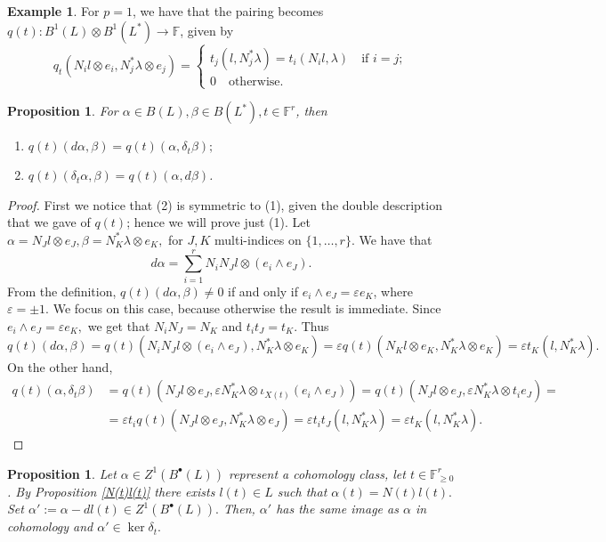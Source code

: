 \documentclass[a4paper,12 pt,titlepage,twoside]{book}
\newcommand{\numberset}{\mathbb}
\newcommand{\F}{\numberset{F}}
\newcommand{\epsi}{\varepsilon}
\theoremstyle{plain}
\theoremstyle{theorem}
\newtheorem{prop}[thm]{Proposition}
\theoremstyle{definition}
\newtheorem{exm}[thm]{Example}
\theoremstyle{remark}
\begin{document}
	\begin{exm}
		For $p=1$, we have that the pairing becomes $q(t) \colon B^1(L) \otimes B^1(L^*) \rightarrow \F$, given by $$q_t(N_i l \otimes e_i, N_j^* \lambda \otimes e_j) = \begin{cases}
		t_j(l, N_j^*\lambda) = t_i(N_il, \lambda) \quad \text{if } i=j;\\ 0 \quad \text{otherwise}.
		\end{cases}$$
	\end{exm}
	\begin{prop}\label{pseudosymmetry}
		For $\alpha \in B(L), \beta \in B(L^*), t \in \F^r$, then \begin{enumerate}[label=(\arabic*)]
			\item $q(t)(d\alpha, \beta) = q(t)(\alpha, \delta_t \beta);$
			\item $q(t)(\delta_t\alpha, \beta) = q(t)(\alpha, d\beta)$.
		\end{enumerate}
	\end{prop}
	\begin{proof}
		First we notice that (2) is symmetric to (1), given the double description that we gave of $q(t)$; hence we will prove just (1). Let $\alpha = N_J l \otimes e_J, \beta = N_K^* \lambda \otimes e_K,$ for $J,K$ multi-indices on $\{1, \dots, r\}.$ We have that $$d\alpha = \sum_{i=1}^r N_i N_J l \otimes (e_i \wedge e_J).$$ From the definition, $q(t)(d\alpha, \beta) \neq 0$ if and only if $e_i \wedge e_J = \epsi e_K$, where $\epsi =\pm 1.$ We focus on this case, because otherwise the result is immediate. Since $e_i \wedge e_J = \epsi e_K,$ we get that $N_i N_J = N_K$ and $t_i t_J = t_K.$ Thus $$q(t)(d\alpha, \beta) = q(t)(N_i N_J l \otimes (e_i\wedge e_J), N_K^*\lambda \otimes e_K) = \epsi q(t)(N_Kl \otimes e_K, N_K^* \lambda \otimes e_K) = \epsi t_K(l, N_K^* \lambda).$$ On the other hand, $$\begin{aligned} q(t)(\alpha, \delta_t \beta) &= q(t)(N_J l \otimes e_J, \epsi N_K^* \lambda \otimes \iota_{X(t)}(e_i \wedge e_J)) = q(t)(N_J l \otimes e_J, \epsi N_K^* \lambda \otimes t_i e_J) =\\&= \epsi t_i q(t)(N_J l \otimes e_J, N_K^*\lambda \otimes e_J) = \epsi t_i t_J (l, N_K^* \lambda) = \epsi t_K (l, N_K^* \lambda). \end{aligned}$$
	\end{proof}
	\begin{prop}\label{alpha'}
		Let $\alpha \in Z^1(B^\bullet(L))$ represent a cohomology class, let $t \in \F^r_{\ge 0}$. By Proposition \ref{N(t)l(t)} there exists $l(t) \in L$ such that $\alpha(t) = N(t)l(t).$ Set $\alpha' := \alpha - dl(t) \in Z^1(B^\bullet(L)).$ Then, $\alpha'$ has the same image as $\alpha$ in cohomology and $\alpha' \in \ker \delta_t.$
	\end{prop}
\end{document}
